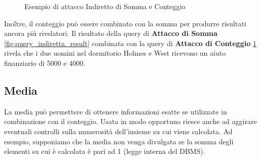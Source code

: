 \begin{figure}[htpb]
	\centering
				
							\caption{Esempio di attacco Indiretto di Somma e Conteggio \label{fig:query_indiretta_result1}}                           
	
\end{figure}

Inoltre, il conteggio può essere combinato con la somma per produrre risultati ancora più rivelatori. Il risultato della query di \textbf{Attacco di Somma} \ref{fig:query_indiretta_result} combinata con la query di \textbf{Attacco di Conteggio} \ref{fig:query_indiretta_result1} rivela che i due uomini nel dormitorio Holmes e West ricevono un aiuto finanziario di 5000 e 4000.

\subsection{Media}

La media può permettere di ottenere informazioni esatte se utilizzate in combinazione con il conteggio. Usata in modo opportuno riesce anche ad aggirare eventuali controlli sulla numerosità dell'insieme su cui viene calcolata.
Ad esempio, supponiamo che la media non venga divulgata se la somma degli elementi su cui è calcolata è pari ad 1 (legge interna del DBMS). 

